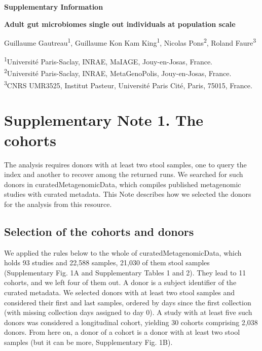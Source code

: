 \documentclass[11pt,a4paper]{article}
\begin{document}
{\large\bfseries Supplementary Information}

{\bfseries Adult gut microbiomes single out individuals at population scale}

Guillaume Gautreau\textsuperscript{1}, Guillaume Kon Kam King\textsuperscript{1}, Nicolas Pons\textsuperscript{2}, Roland Faure\textsuperscript{3}

{\small\textsuperscript{1}Université Paris-Saclay, INRAE, MaIAGE, Jouy-en-Josas, France.\\
\textsuperscript{2}Université Paris-Saclay, INRAE, MetaGenoPolis, Jouy-en-Josas, France.\\
\textsuperscript{3}CNRS UMR3525, Institut Pasteur, Université Paris Cité, Paris, 75015, France.}

{\small\setcounter{tocdepth}{3}
\renewcommand{\contentsname}{Contents}\tableofcontents
\renewcommand{\listfigurename}{Supplementary Figures}\listoffigures
\renewcommand{\listtablename}{Supplementary Tables}\listoftables}
\clearpage

\FloatBarrier
\section*{Supplementary Note 1. The cohorts}

The analysis requires donors with at least two stool samples, one to query the index and another to recover among the returned runs. We searched for such donors in curatedMetagenomicData, which compiles published metagenomic studies with curated metadata. This Note describes how we selected the donors for the analysis from this resource.

\subsection*{Selection of the cohorts and donors}

We applied the rules below to the whole of curatedMetagenomicData, which holds 93 studies and 22,588 samples, 21,030 of them stool samples (Supplementary Fig. 1A and Supplementary Tables 1 and 2). They lead to 11 cohorts, and we left four of them out. A donor is a subject identifier of the curated metadata. We selected donors with at least two stool samples and considered their first and last samples, ordered by days since the first collection (with missing collection days assigned to day 0). A study with at least five such donors was considered a longitudinal cohort, yielding 30 cohorts comprising 2,038 donors. From here on, a donor of a cohort is a donor with at least two stool samples (but it can be more, Supplementary Fig. 1B).
\end{document}
